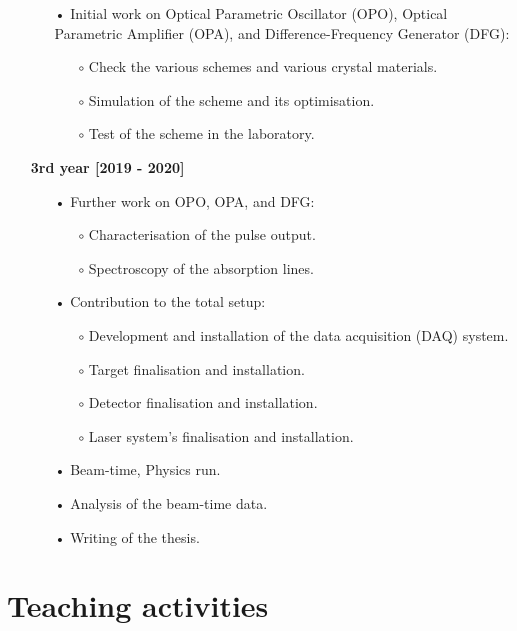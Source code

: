 \documentclass[12pt]{article}
\begin{document}
\begin{itemize}
\begin{itemize}
\item[•]
	Initial work on Optical Parametric Oscillator (OPO), Optical Parametric Amplifier (OPA), and Difference-Frequency Generator (DFG):
	\begin{itemize}
		\item[$\circ$]
		Check the various schemes and various crystal materials.
		\item[$\circ$]
		Simulation of the scheme and its optimisation.
		\item[$\circ$]
		Test of the scheme in the laboratory.
	\end{itemize}
\end{itemize}
\item[]
\textbf{3rd year [2019 - 2020]}
\begin{itemize}
	\item[•]
	Further work on OPO, OPA, and DFG:
	\begin{itemize}			 
		\item[$\circ$]
		Characterisation of the pulse output.
		\item[$\circ$]
		Spectroscopy of the absorption lines. 
	\end{itemize}		
	\item[•]
    Contribution to the total setup:
	\begin{itemize}
		\item[$\circ$]
		Development and installation of the data acquisition (DAQ) system. 
		\item[$\circ$]
		Target finalisation and installation. 
		\item[$\circ$]
		Detector finalisation and installation.
		\item[$\circ$]
		Laser system's finalisation and installation. 
	\end{itemize}
	\item[•]
	Beam-time, Physics run.
	\item[•]
	Analysis of the beam-time data.
	\item[•]
	Writing of the thesis.
\end{itemize}
\end{itemize}
\vspace{3.9pt}


\section{Teaching activities}
\end{document}

